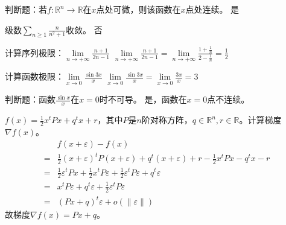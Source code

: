 

\newcommand\Title{2020智能计算数学基础试卷}
\renewcommand\due{due: November 6, 2022}

\newcommand{\todo}{{\color{red} to do}} %




\begin{problem}
	判断题：若$f:\mathbb{R}^n\to\mathbb{R}$在$x$点处可微，则该函数在$x$点处连续。
	\solution 是
\end{problem}

\begin{problem}
	级数$\sum_{n\ge 1}\frac{n}{n^2+1}$收敛。
	\solution 否
\end{problem}

\begin{problem}
	计算序列极限：$\underset{n\to +\infty}{\lim}\frac{n+1}{2n-1}$
	\solution $\underset{n\to +\infty}{\lim}\frac{n+1}{2n-1} = \underset{n\to +\infty}{\lim}\frac{1+\frac{1}{n}}{2-\frac{1}{n}} = \frac{1}{2}$
\end{problem}

\begin{problem}
	计算函数极限：$\underset{x\to 0}{\lim}\frac{\sin 3x}{x}$
	\solution $\underset{x\to 0}{\lim}\frac{\sin 3x}{x} = \underset{x\to 0}{\lim}\frac{3x}{x} = 3$
\end{problem}

\begin{problem}
	判断题：函数$\frac{\sin x}{x}$在$x=0$时不可导。
	\solution 是，函数在$x=0$点不连续。
\end{problem}

\begin{problem}
	$f(x)=\frac{1}{2}x^tPx+q^tx+r$，其中$P$是$n$阶对称方阵，$q\in\mathbb{R}^{n},r\in\mathbb{R}$。计算梯度$\nabla f(x)$。
	\solution \begin{align*}
		&f(x+\varepsilon)-f(x)\\
		=&\frac{1}{2}(x+\varepsilon)^tP(x+\varepsilon)+q^t(x+\varepsilon)+r-\frac{1}{2}x^tPx-q^tx-r\\
		=&\frac{1}{2}\varepsilon^tPx+\frac{1}{2}x^tP\varepsilon+\frac{1}{2}\varepsilon^tP\varepsilon +q^t\varepsilon\\
		=&x^tP\varepsilon+q^t\varepsilon +\frac{1}{2}\varepsilon ^tP\varepsilon \\
		=&(Px+q)^t\varepsilon +o(\|\varepsilon \|)  
	\end{align*}
	故梯度$\nabla f(x)=Px+q$。
\end{problem}

